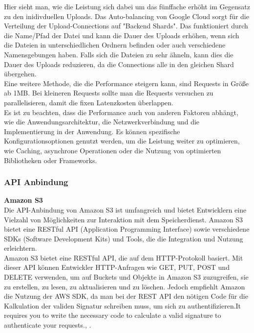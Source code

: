 Hier sieht man, wie die Leistung sich dabei um das fünffache erhöht im Gegensatz zu den inidivduellen Uploads. Das Auto-balancing von Google Cloud sorgt für die Verteilung der Upload-Connections auf "Backend Shards". Das funktioniert durch die Name/Pfad der Datei und kann die Dauer des Uploads erhöhen, wenn sich die Dateien in unterschiedlichen Ordnern befinden oder auch verschiedene Namensgebungen haben. Falls sich die Dateien zu sehr ähneln, kann dies die Dauer des Uploads reduzieren, da die Connections alle in den gleichen Shard übergehen.\\

Eine weitere Methode, die die Performance steigern kann, sind Requests in Größe ab 1MB. Bei kleineren Requests sollte man die Requests versuchen zu parallelisieren, damit die fixen Latenzkosten überlappen.\\

Es ist zu beachten, dass die Performance auch von anderen Faktoren abhängt, wie die Anwendungsarchitektur, die Netzwerkverbindung und die Implementierung in der Anwendung. Es können spezifische Konfigurationsoptionen genutzt werden, um die Leistung weiter zu optimieren, wie Caching, asynchrone Operationen oder die Nutzung von optimierten Bibliotheken oder Frameworks. 

\newpage

\subsubsection{API Anbindung}

\textbf{Amazon S3}\\

Die API-Anbindung von Amazon S3 ist umfangreich und bietet Entwicklern eine Vielzahl von Möglichkeiten zur Interaktion mit dem Speicherdienst. Amazon S3 bietet eine RESTful API (Application Programming Interface) sowie verschiedene SDKs (Software Development Kits) und Tools, die die Integration und Nutzung erleichtern.\\

Amazon S3 bietet eine RESTful API, die auf dem HTTP-Protokoll basiert. Mit dieser API können Entwickler HTTP-Anfragen wie GET, PUT, POST und DELETE verwenden, um auf Buckets und Objekte in Amazon S3 zuzugreifen, sie zu erstellen, zu lesen, zu aktualisieren und zu löschen. Jedoch empfiehlt Amazon die Nutzung der AWS SDK, da man bei der REST API den nötigen Code für die Kalkulation der validen Signatur schreiben muss, um sich zu authentifizieren.\glqq It requires you to write the necessary code to calculate a valid signature to authenticate your requests.\grqq, \cite{aws-api}.\\

